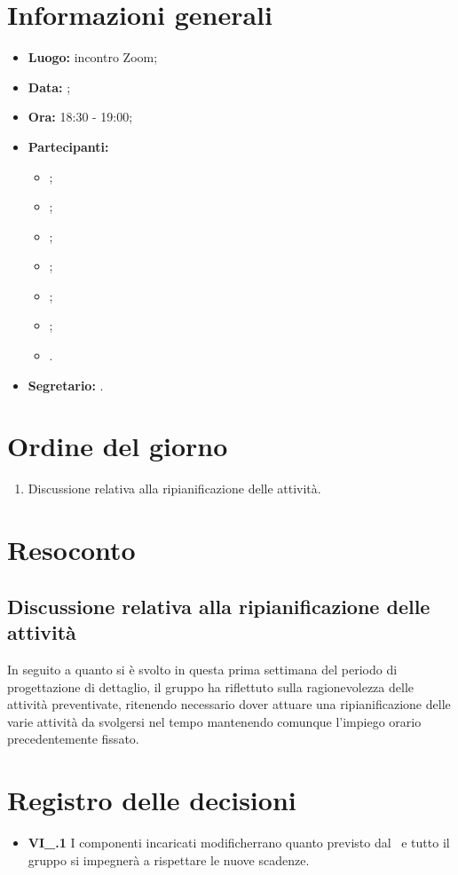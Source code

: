 \section{Informazioni generali}
\begin{itemize}
	\item \textbf{Luogo:} incontro Zoom;
	\item \textbf{Data:} \Data;
	\item \textbf{Ora:} 18:30 - 19:00;
	\item \textbf{Partecipanti:}
	\begin{itemize}
		\item \BL{}; 
		\item \FF{};
		\item \MM{}; 
		\item \PC{};
		\item \TG{};
		\item \TL{};
		\item \VD{}.
	\end{itemize} 
	\item \textbf{Segretario:} \BL{}.
\end{itemize}

\section{Ordine del giorno}
\begin{enumerate}
	\item Discussione relativa alla ripianificazione delle attività.
\end{enumerate}

\section{Resoconto}
\subsection{Discussione relativa alla ripianificazione delle attività}
In seguito a quanto si è svolto in questa prima settimana del periodo di progettazione di dettaglio, il gruppo ha riflettuto sulla ragionevolezza delle attività preventivate, ritenendo necessario dover attuare una ripianificazione delle varie attività da svolgersi nel tempo mantenendo comunque l'impiego orario precedentemente fissato.

\section{Registro delle decisioni}
\begin{itemize}
	\item \textbf{VI\_\Data.1} I componenti incaricati modificherrano quanto previsto dal \PdP\ e tutto il gruppo si impegnerà a rispettare le nuove scadenze.
\end{itemize}